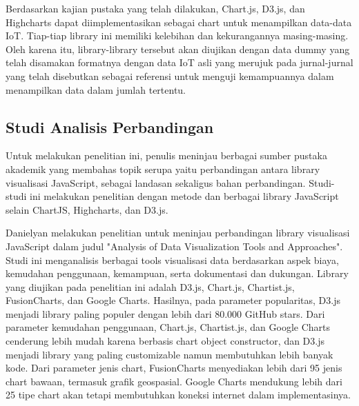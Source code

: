 Berdasarkan kajian pustaka yang telah dilakukan, Chart.js, D3.js, dan Highcharts dapat diimplementasikan sebagai chart untuk menampilkan data-data IoT. Tiap-tiap library ini memiliki kelebihan dan kekurangannya masing-masing. Oleh karena itu, library-library tersebut akan diujikan dengan data dummy yang telah disamakan formatnya dengan data IoT asli yang merujuk pada jurnal-jurnal yang telah disebutkan sebagai referensi untuk menguji kemampuannya dalam menampilkan data dalam jumlah tertentu. 

\subsection{Studi Analisis Perbandingan}
Untuk melakukan penelitian ini, penulis meninjau berbagai sumber pustaka akademik yang membahas topik serupa yaitu perbandingan antara library visualisasi JavaScript, sebagai landasan sekaligus bahan perbandingan. Studi-studi ini melakukan penelitian dengan metode dan berbagai library JavaScript selain ChartJS, Highcharts, dan D3.js. 

Danielyan \cite{Danielyan2018} melakukan penelitian untuk meninjau perbandingan library visualisasi JavaScript dalam judul "Analysis of Data Visualization Tools and Approaches". Studi ini menganalisis berbagai tools visualisasi data berdasarkan aspek biaya, kemudahan penggunaan, kemampuan, serta dokumentasi dan dukungan. Library yang diujikan pada penelitian ini adalah D3.js, Chart.js, Chartist.js, FusionCharts, dan Google Charts. Hasilnya, pada  parameter popularitas,  D3.js menjadi library paling populer dengan lebih dari 80.000 GitHub stars. Dari parameter kemudahan penggunaan, Chart.js, Chartist.js, dan Google Charts cenderung lebih mudah karena berbasis chart object constructor, dan D3.js menjadi library yang paling customizable namun membutuhkan lebih banyak kode. Dari parameter jenis chart, FusionCharts menyediakan lebih dari 95 jenis chart bawaan, termasuk grafik geospasial. Google Charts mendukung lebih dari 25 tipe chart akan tetapi membutuhkan koneksi internet dalam implementasinya. 

